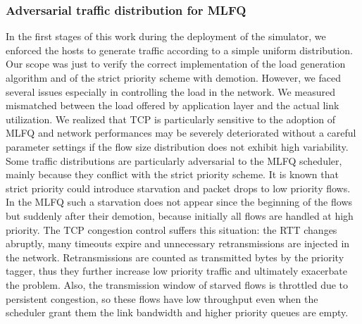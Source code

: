 \subsubsection{Adversarial traffic distribution for MLFQ}
In the first stages of this work during the deployment of the simulator, we enforced the hosts to generate traffic according to a simple uniform distribution. Our scope was just to verify the correct implementation of the load generation algorithm and of the strict priority scheme with demotion.  However, we faced several issues especially in controlling the load in the network. We measured mismatched between the load offered by application layer and the actual link utilization. We realized that TCP is particularly sensitive to the adoption of MLFQ and network performances may be severely deteriorated without a careful parameter settings if the flow size distribution does not exhibit high variability. Some traffic distributions are particularly adversarial to the MLFQ scheduler, mainly because they conflict with the strict priority scheme. It is known that strict priority could introduce starvation and packet drops to low priority flows. In the MLFQ such a starvation does not appear since the beginning of the flows but suddenly after their demotion, because initially all flows are handled at high priority. The TCP congestion control suffers this situation: the RTT changes abruptly, many timeouts expire and unnecessary retransmissions are injected in the network. Retransmissions are counted as transmitted bytes by the priority tagger, thus they further increase low priority traffic and ultimately exacerbate the problem. Also, the transmission window of starved flows is throttled due to persistent congestion, so these flows have low throughput even when the scheduler grant them the link bandwidth and higher priority queues are empty. 
